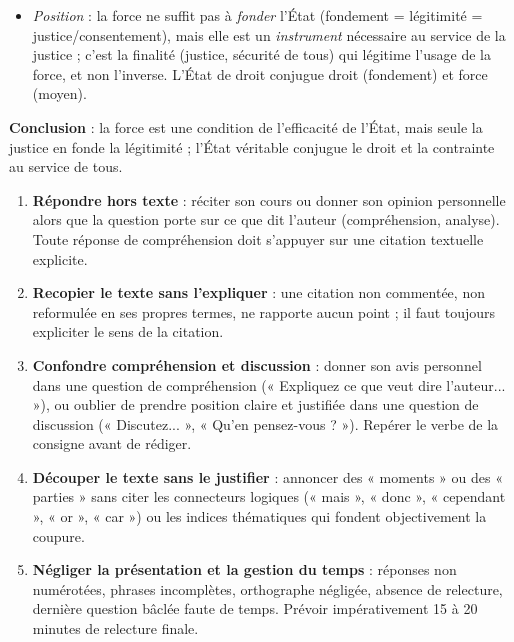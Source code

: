 \documentclass[11pt]{article}
\newcommand{\cle}[1]{{\popxbold\color{popdark}#1}}
\begin{document}
\begin{exoresolu}
\begin{enumerate}
\begin{itemize}
\item \emph{Position} : la force ne suffit pas à \emph{fonder} l'État (fondement = légitimité = justice/consentement), mais elle est un \emph{instrument} nécessaire au service de la justice ; c'est la finalité (justice, sécurité de tous) qui légitime l'usage de la force, et non l'inverse. L'État de droit conjugue \cle{droit} (fondement) et \cle{force} (moyen).
\end{itemize}
\end{enumerate}
\textbf{Conclusion} : la force est une condition de l'efficacité de l'État, mais seule la justice en fonde la légitimité ; l'État véritable conjugue le droit et la contrainte au service de tous.
\end{exoresolu}

\begin{attention}
\begin{enumerate}
\item \textbf{Répondre hors texte} : réciter son cours ou donner son opinion personnelle alors que la question porte sur ce que dit l'auteur (compréhension, analyse). Toute réponse de compréhension doit s'appuyer sur une citation textuelle explicite.
\item \textbf{Recopier le texte sans l'expliquer} : une citation non commentée, non reformulée en ses propres termes, ne rapporte aucun point ; il faut toujours expliciter le sens de la citation.
\item \textbf{Confondre compréhension et discussion} : donner son avis personnel dans une question de compréhension (« Expliquez ce que veut dire l'auteur... »), ou oublier de prendre position claire et justifiée dans une question de discussion (« Discutez... », « Qu'en pensez-vous ? »). Repérer le verbe de la consigne avant de rédiger.
\item \textbf{Découper le texte sans le justifier} : annoncer des « moments » ou des « parties » sans citer les connecteurs logiques (« mais », « donc », « cependant », « or », « car ») ou les indices thématiques qui fondent objectivement la coupure.
\item \textbf{Négliger la présentation et la gestion du temps} : réponses non numérotées, phrases incomplètes, orthographe négligée, absence de relecture, dernière question bâclée faute de temps. Prévoir impérativement 15 à 20 minutes de relecture finale.
\end{enumerate}
\end{attention}
\end{document}
